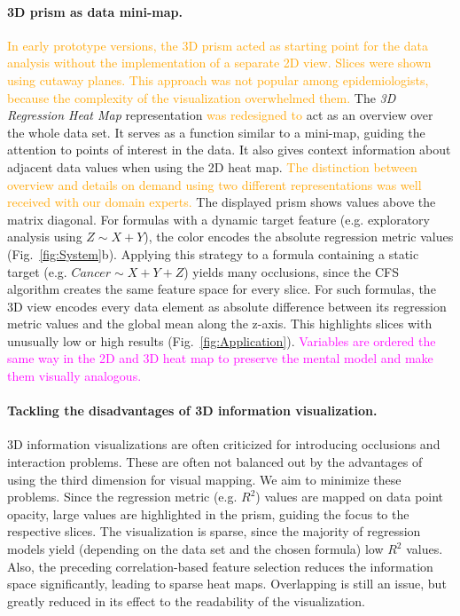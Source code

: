 \documentclass[journal]{style/vgtc} 			          %
\newcommand{\design}[1]{\textcolor{orange}{#1}}
\newcommand{\magenta}[1]{\textcolor{magenta}{#1}}
\begin{document}
\paragraph{3D prism as data mini-map.}
\design{
In early prototype versions, the 3D prism acted as starting point for the data analysis without the implementation of a separate 2D view.
Slices were shown using cutaway planes.
This approach was not popular among epidemiologists, because the complexity of the visualization overwhelmed them. %
}
The \emph{3D Regression Heat Map} representation \design{was redesigned to} act as an overview over the whole data set.
It serves as a function similar to a mini-map, guiding the attention to points of interest in the data.
It also gives context information about adjacent data values when using the 2D heat map.
\design{The distinction between overview and details on demand using two different representations was well received with our domain experts.}
The displayed prism shows values above the matrix diagonal.
For formulas with a dynamic target feature (e.g. exploratory analysis using $Z \sim X + Y$), the color encodes the absolute regression metric values (Fig.~\ref{fig:System}b).
Applying this strategy to a formula containing a static target (e.g. $Cancer \sim X + Y + Z$) yields many occlusions, since the CFS algorithm creates the same feature space for every slice.
For such formulas, the 3D view encodes every data element as absolute difference between its regression metric values and the global mean along the z-axis.
This highlights slices with unusually low or high results (Fig.~\ref{fig:Application}).
\magenta{Variables are ordered the same way in the 2D and 3D heat map to preserve the mental model and make them visually analogous.}

\paragraph{Tackling the disadvantages of 3D information visualization.}
3D information visualizations are often criticized for introducing occlusions and interaction problems.
These are often not balanced out by the advantages of using the third dimension for visual mapping.
We aim to minimize these problems.
Since the regression metric (e.g. $R^2$) values are mapped on data point opacity, large values are highlighted in the prism, guiding the focus to the respective slices.
The visualization is sparse, since the majority of regression models yield (depending on the data set and the chosen formula) low $R^2$ values.
Also, the preceding correlation-based feature selection reduces the information space significantly, leading to sparse heat maps.
Overlapping is still an issue, but greatly reduced in its effect to the readability of the visualization.
\end{document}
